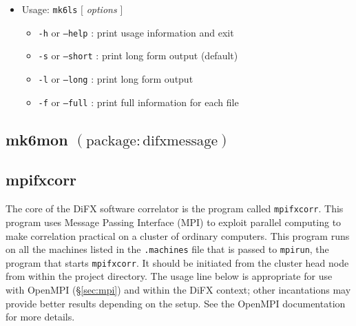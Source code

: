 \begin{itemize}
\item[] Usage: {\tt mk6ls} $[$ {\em options} $]$
\begin{itemize}
\item[] {\tt -h} or {\tt --help} : print usage information and exit
\item[] {\tt -s} or {\tt --short} : print long form output (default)
\item[] {\tt -l} or {\tt --long} : print long form output
\item[] {\tt -f} or {\tt --full} : print full information for each file
\end{itemize}
\end{itemize}




\subsection{mk6mon {\small $\mathrm{(package: difxmessage)}$}} \label{sec:mk6mon} 












\subsection{mpifxcorr} \label{sec:mpifxcorr}

The core of the DiFX software correlator is the program called {\tt mpifxcorr}.
This program uses Message Passing Interface (MPI) to exploit parallel computing to make correlation practical on a cluster of ordinary computers.
This program runs on all the machines listed in the {\tt .machines} file that is passed to {\tt mpirun}, the program that starts {\tt mpifxcorr}.
It should be initiated from the cluster head node from within the project directory.
The usage line below is appropriate for use with OpenMPI (\S\ref{sec:mpi}) and within the DiFX context; other incantations may provide better results depending on the setup.
See the OpenMPI documentation for more details.


